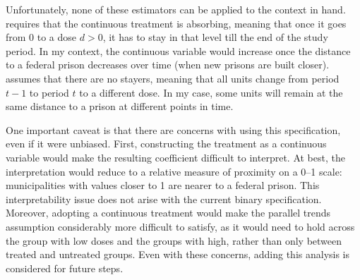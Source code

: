 Unfortunately, none of these estimators can be applied to the context in hand. \cite{CallawayGoodmanBaconSantAnna2024} requires that the continuous treatment is absorbing, meaning that once it goes from 0 to a dose $d>0$, it has to stay in that level till the end of the study period. In my context, the continuous variable would increase once the distance to a federal prison decreases over time (when new prisons are built closer). \cite{Cont-Chaise-AEA} assumes that there are no stayers, meaning that all units change from period $t-1$ to period $t$ to a different dose. In my case, some units will remain at the same distance to a prison at different points in time. 

One important caveat is that there are concerns with using this specification, even if it were unbiased. First, constructing the treatment as a continuous variable would make the resulting coefficient difficult to interpret. At best, the interpretation would reduce to a relative measure of proximity on a 0–1 scale: municipalities with values closer to 1 are nearer to a federal prison. This interpretability issue does not arise with the current binary specification. Moreover, adopting a continuous treatment would make the parallel trends assumption considerably more difficult to satisfy, as it would need to hold across the group with low doses and the groups with high, rather than only between treated and untreated groups. Even with these concerns, adding this analysis is considered for future steps.

